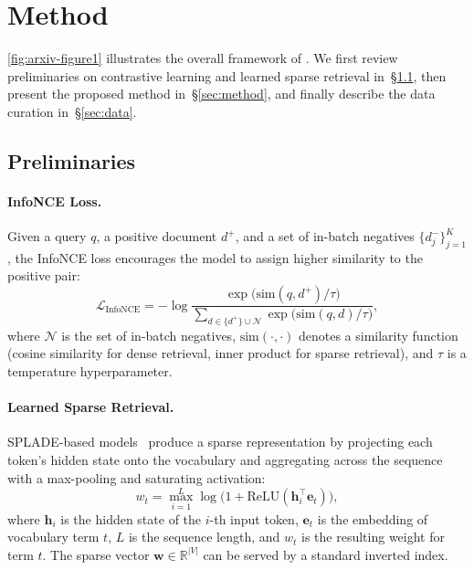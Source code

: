\section{Method}

\autoref{fig:arxiv-figure1} illustrates the overall framework of \ours.
We first review preliminaries on contrastive learning and learned sparse retrieval in~\S\ref{sec:preliminaries}, then present the proposed method in~\S\ref{sec:method}, and finally describe the data curation in~\S\ref{sec:data}.

\subsection{Preliminaries}
\label{sec:preliminaries}

\paragraph{InfoNCE Loss.}
Given a query $q$, a positive document $d^{+}$, and a set of in-batch negatives $\{d^{-}_{j}\}_{j=1}^{K}$, the InfoNCE loss encourages the model to assign higher similarity to the positive pair:
\begin{equation}\label{eq:infonce}
\mathcal{L}_{\text{InfoNCE}} = -\log \frac{\exp\bigl(\text{sim}(q, d^{+}) / \tau\bigr)}{\sum_{d \in \{d^+\} \cup \mathcal{N}}\exp\bigl(\text{sim}(q, d) / \tau\bigr)},
\end{equation}
where $\mathcal{N}$ is the set of in-batch negatives, $\text{sim}(\cdot,\cdot)$ denotes a similarity function (\eg cosine similarity for dense retrieval, inner product for sparse retrieval), and $\tau$ is a temperature hyperparameter.

\paragraph{Learned Sparse Retrieval.}
SPLADE-based models~\citep{spladev1, spladev2} produce a sparse representation by projecting each token's hidden state onto the vocabulary and aggregating across the sequence with a max-pooling and saturating activation: 
\begin{equation}\label{eq:splade}
w_{t} = \max_{i=1}^{L} \log\bigl(1 + \text{ReLU}(\bm{h}_{i}^{\top} \bm{e}_{t})\bigr),
\end{equation}
where $\bm{h}_{i}$ is the hidden state of the $i$-th input token, $\bm{e}_{t}$ is the embedding of vocabulary term $t$, $L$ is the sequence length, and $w_{t}$ is the resulting weight for term $t$. The sparse vector $\bm{w} \in \mathbb{R}^{|V|}$ can be served by a standard inverted index.

